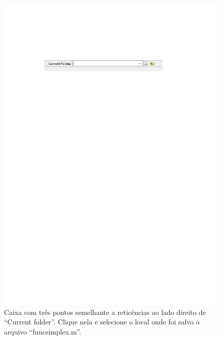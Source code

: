 \documentclass[10pt]{article}
\begin{document}
\begin{figure}[H]
    \centering
    \includegraphics[scale = 0.65]{fig2teste2.pdf}
    \caption{Caixa com três pontos semelhante a reticências ao lado direito de ``Current folder''. Clique nela e selecione o local onde foi salvo o arquivo ``funcsimplex.m''.}
\end{figure}
\end{document}

